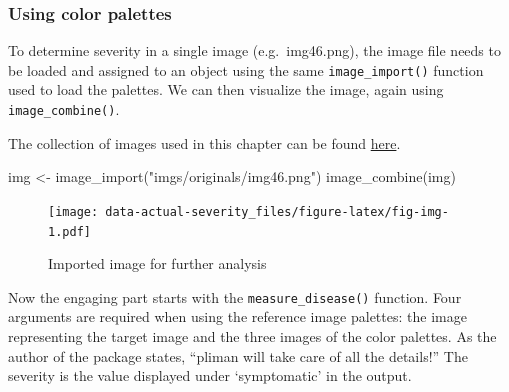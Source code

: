 \documentclass[
  letterpaper,
]{book}
\newenvironment{Shaded}{\begin{snugshade}}{\end{snugshade}}
\newcommand{\FunctionTok}[1]{\textcolor[rgb]{0.28,0.35,0.67}{#1}}
\newcommand{\NormalTok}[1]{\textcolor[rgb]{0.00,0.23,0.31}{#1}}
\newcommand{\OtherTok}[1]{\textcolor[rgb]{0.00,0.23,0.31}{#1}}
\newcommand{\StringTok}[1]{\textcolor[rgb]{0.13,0.47,0.30}{#1}}
\begin{document}
\hypertarget{using-color-palettes}{%
\subsubsection{Using color palettes}\label{using-color-palettes}}

To determine severity in a single image (e.g.~img46.png), the image file
needs to be loaded and assigned to an object using the same
\texttt{image\_import()} function used to load the palettes. We can then
visualize the image, again using \texttt{image\_combine()}.

\begin{tcolorbox}[enhanced jigsaw, titlerule=0mm, rightrule=.15mm, colbacktitle=quarto-callout-tip-color!10!white, opacitybacktitle=0.6, toptitle=1mm, leftrule=.75mm, colback=white, colframe=quarto-callout-tip-color-frame, bottomrule=.15mm, toprule=.15mm, breakable, bottomtitle=1mm, coltitle=black, title=\textcolor{quarto-callout-tip-color}{\faLightbulb}\hspace{0.5em}{Tip}, arc=.35mm, opacityback=0, left=2mm]

The collection of images used in this chapter can be found
\href{https://github.com/emdelponte/epidemiology-R/tree/main/imgs/originals}{here}.

\end{tcolorbox}

\begin{Shaded}
\begin{Highlighting}[]
\NormalTok{img }\OtherTok{\textless{}{-}} \FunctionTok{image\_import}\NormalTok{(}\StringTok{"imgs/originals/img46.png"}\NormalTok{)}
\FunctionTok{image\_combine}\NormalTok{(img)}
\end{Highlighting}
\end{Shaded}

\begin{figure}

\texttt{[image: data-actual-severity\_files/figure-latex/fig-img-1.pdf]} \hfill{}

\caption{\label{fig-img}Imported image for further analysis}

\end{figure}

Now the engaging part starts with the \texttt{measure\_disease()}
function. Four arguments are required when using the reference image
palettes: the image representing the target image and the three images
of the color palettes. As the author of the package states, ``pliman
will take care of all the details!'' The severity is the value displayed
under `symptomatic' in the output.
\end{document}

